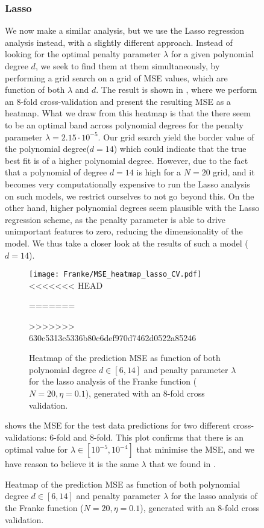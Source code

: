 \begin{figure}
        \subsubsection{Lasso}\label{sec:lassoanalysis}

        We now make a similar analysis, but we use the Lasso regression analysis instead, with a slightly different approach. Instead of looking for the optimal penalty parameter $\lambda$ for a given polynomial degree $d$, we seek to find them at them simultaneously, by performing a grid search on a grid of MSE values, which are function of both $\lambda$ and $d$. The result is shown in , where we perform an 8-fold cross-validation and present the resulting MSE as a heatmap. 
        What we draw from this heatmap is that the there seem to be an optimal band across polynomial degrees for the penalty parameter $\lambda =2.15\cdot10^{-5}$. Our grid search yield the border value of the polynomial degree($d=14$) which could indicate that the true best fit is of a higher polynomial degree. However, due to the fact that a polynomial of degree $d=14$ is high for a $N=20$ grid, and it becomes very computationally expensive to run the Lasso analysis on such models, we restrict ourselves to not go beyond this. On the other hand, higher polynomial degrees seem plausible with the Lasso regression scheme, as the penalty parameter is able to drive unimportant features to zero, reducing the dimensionality of the model. We thus take a closer look at the results of such a model ($d=14$). 

        \begin{figure}
            \texttt{[image: Franke/MSE\_heatmap\_lasso\_CV.pdf]}
<<<<<<< HEAD
            \caption{Heatmap of the MSE as function of both polynomial degree $d\in[6,14]$ and penalty parameter $\lambda$ for the Lasso analysis of the Franke function ($N=20, \eta=0.1$), generated with and 8-fold cross-validation.}
=======
            \caption{Heatmap of the prediction MSE as function of both polynomial degree $d\in[6,14]$ and penalty parameter $\lambda$ for the lasso analysis of the Franke function ($N=20, \eta=0.1$), generated with an 8-fold cross validation.}
>>>>>>> 630c5313c5336b80c6def970d7462d0522a85246
            \label{fig:gridsearch_cv_lasso}
        \end{figure}

         shows the MSE for the test data predictions for two different cross-validations: 6-fold and 8-fold. This plot confirms that there is an optimal value for $\lambda\in[10^{-5}, 10^{-4}]$ that minimise the MSE, and we have reason to believe it is the same $\lambda$ that we found in .


\end{figure}
